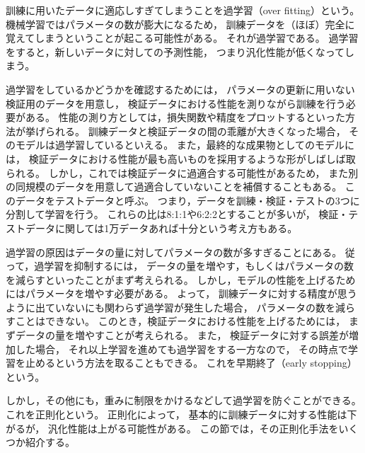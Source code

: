 \documentclass[class=jsarticle, crop=false, dvipdfmx, fleqn]{standalone}
\begin{document}
訓練に用いたデータに適応しすぎてしまうことを過学習（over fitting）という。
機械学習ではパラメータの数が膨大になるため，
訓練データを（ほぼ）完全に覚えてしまうということが起こる可能性がある。
それが過学習である。
過学習をすると，新しいデータに対しての予測性能，
つまり汎化性能が低くなってしまう。

過学習をしているかどうかを確認するためには，
パラメータの更新に用いない検証用のデータを用意し，
検証データにおける性能を測りながら訓練を行う必要がある。
性能の測り方としては，損失関数や精度をプロットするといった方法が挙げられる。
訓練データと検証データの間の乖離が大きくなった場合，
そのモデルは過学習しているといえる。
また，最終的な成果物としてのモデルには，
検証データにおける性能が最も高いものを採用するような形がしばしば取られる。
しかし，これでは検証データに過適合する可能性があるため，
また別の同規模のデータを用意して過適合していないことを補償することもある。
このデータをテストデータと呼ぶ。
つまり，データを訓練・検証・テストの3つに分割して学習を行う。
これらの比は8:1:1や6:2:2とすることが多いが，
検証・テストデータに関しては1万データあれば十分という考え方もある。

過学習の原因はデータの量に対してパラメータの数が多すぎることにある。
従って，過学習を抑制するには，
データの量を増やす，もしくはパラメータの数を減らすといったことがまず考えられる。
しかし，モデルの性能を上げるためにはパラメータを増やす必要がある。
よって，
訓練データに対する精度が思うように出ていないにも関わらず過学習が発生した場合，
パラメータの数を減らすことはできない。
このとき，検証データにおける性能を上げるためには，
まずデータの量を増やすことが考えられる。
また，
検証データに対する誤差が増加した場合，
それ以上学習を進めても過学習をする一方なので，
その時点で学習を止めるという方法を取ることもできる。
これを早期終了（early stopping）という。

しかし，その他にも，重みに制限をかけるなどして過学習を防ぐことができる。
これを正則化という。
正則化によって，
基本的に訓練データに対する性能は下がるが，
汎化性能は上がる可能性がある。
この節では，その正則化手法をいくつか紹介する。


\begin{comment}
\subsection{L1正則化}%

LASSO (Least Absolute Shrinkage and Selection Operator)とも呼ばれる。
損失に重みの絶対値の項を加える。
\begin{equation}
J = L(t,\ y) + \lambda |\bm{W}|
\end{equation}
ここで，$\lambda$はハイパーパラメータである。
説明変数のうち一部を0にすることによってスパースな解を得て，
変数選択を行うことができるといった特徴があるが，
学習が不安定になる。
\end{comment}
\end{document}
